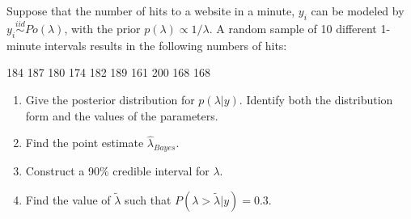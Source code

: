   \item 
    Suppose that the number of hits to a website in a minute, $y_i$ can be modeled by $y_i\stackrel{iid}{\sim}Po(\lambda)$, with the prior  $p(\lambda) \propto 1/ \lambda$. A random sample of 10 different 1-minute intervals results in the following numbers of hits: 
    
    184	187	180	174	182	189	161	200	168	168
    
    \begin{enumerate}
      \item Give the posterior distribution for $p( \lambda | y)$. Identify both the distribution form and the values of the parameters. 
      \item Find the point estimate $\hat{\lambda}_{Bayes}$. 
      \item Construct a 90\% credible interval for $\lambda$. 
      \item Find the value of $\tilde{\lambda}$ such that $P(\lambda>\tilde{\lambda}|y)=0.3$.
\end{enumerate}

